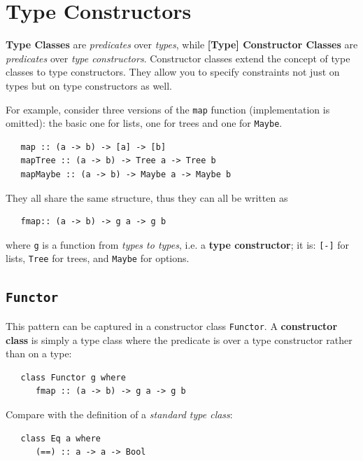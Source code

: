 \section{Type Constructors}
\textbf{Type Classes} are \textit{predicates} over \textit{types},
while \textbf{[Type] Constructor Classes} are \textit{predicates} over \textit{type constructors}.
Constructor classes extend the concept of type classes to type constructors. They allow you to specify constraints not just on types but on type constructors as well.


For example, consider three versions of the \lstinline|map| function (implementation is omitted): the basic one for lists, one for trees and one for \lstinline|Maybe|.
\begin{lstlisting}
   map :: (a -> b) -> [a] -> [b]
   mapTree :: (a -> b) -> Tree a -> Tree b
   mapMaybe :: (a -> b) -> Maybe a -> Maybe b
\end{lstlisting}
They all share the same structure, thus they can all be written as
\begin{lstlisting}
   fmap:: (a -> b) -> g a -> g b
\end{lstlisting}
where \lstinline|g| is a function from \textit{types to types}, i.e.
a \textbf{type constructor};
it is:
\lstinline|[-]| for lists, \lstinline|Tree| for trees, and \lstinline|Maybe| for options.

\subsection{\texttt{Functor}}
This pattern can be captured in a constructor
class \lstinline|Functor|. 
A \textbf{constructor class} is simply a type class where
the predicate is over a type constructor rather
than on a type:
\begin{lstlisting}
   class Functor g where
      fmap :: (a -> b) -> g a -> g b
\end{lstlisting}

Compare with the definition of a \textit{standard type class}:
\begin{lstlisting}
   class Eq a where
      (==) :: a -> a -> Bool
\end{lstlisting}

